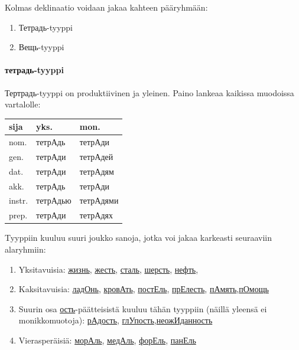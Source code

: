 \documentclass[]{scrartcl}
\providecommand{\tightlist}{%
  \setlength{\itemsep}{0pt}\setlength{\parskip}{0pt}}
\begin{document}
Kolmas deklinaatio voidaan jakaa kahteen pääryhmään:

\begin{enumerate}
\def\labelenumi{\arabic{enumi}.}
\tightlist
\item
  Тетрадь-tyyppi
\item
  Вещь-tyyppi
\end{enumerate}

\paragraph{тетрадь-tyyppi}\label{ux442ux435ux442ux440ux430ux434ux44c-tyyppi}

Тертрадь-tyyppi on produktiivinen ja yleinen. Paino lankeaa kaikissa
muodoissa vartalolle:

\begin{longtable}[c]{@{}lll@{}}
\toprule
sija & yks. & mon.\tabularnewline
\midrule
\endhead
nom. & тетрАдь & тетрАди\tabularnewline
gen. & тетрАди & тетрАдей\tabularnewline
dat. & тетрАди & тетрАдям\tabularnewline
akk. & тетрАдь & тетрАди\tabularnewline
instr. & тетрАдью & тетрАдями\tabularnewline
prep. & тетрАди & тетрАдях\tabularnewline
\bottomrule
\end{longtable}

Tyyppiin kuuluu suuri joukko sanoja, jotka voi jakaa karkeasti
seuraaviin alaryhmiin:

\begin{enumerate}
\def\labelenumi{\arabic{enumi}.}
\tightlist
\item
  Yksitavuisia: \href{http://ru.wiktionary.org/wiki/жизнь}{жизнь},
  \href{http://ru.wiktionary.org/wiki/жесть}{жесть},
  \href{http://ru.wiktionary.org/wiki/сталь}{сталь},
  \href{http://ru.wiktionary.org/wiki/шерсть}{шерсть},
  \href{http://ru.wiktionary.org/wiki/нефть}{нефть},
\item
  Kaksitavuisia: \href{http://ru.wiktionary.org/wiki/ладонь}{ладОнь},
  \href{http://ru.wiktionary.org/wiki/кровать}{кровАть},
  \href{http://ru.wiktionary.org/wiki/постель}{постЕль},
  \href{http://ru.wiktionary.org/wiki/прелесть}{прЕлесть},
  \href{http://ru.wiktionary.org/wiki/память}{пАмять},\href{http://ru.wiktionary.org/wiki/помощь}{пОмощь}
\item
  Suurin osa
  \href{http://ru.wiktionary.org/wiki/ость}{ость}-päätteisistä kuuluu
  tähän tyyppiin (näillä yleensä ei monikkomuotoja):
  \href{http://ru.wiktionary.org/wiki/радость}{рАдость},
  \href{http://ru.wiktionary.org/wiki/глупость}{глУпость},\href{http://ru.wiktionary.org/wiki/неожиданность}{неожИданность}
\item
  Vierasperäisiä: \href{http://ru.wiktionary.org/wiki/мораль}{морАль},
  \href{http://ru.wiktionary.org/wiki/медаль}{медАль},
  \href{http://ru.wiktionary.org/wiki/форель}{форЕль},
  \href{http://ru.wiktionary.org/wiki/панель}{панЕль}
\end{enumerate}
\end{document}
